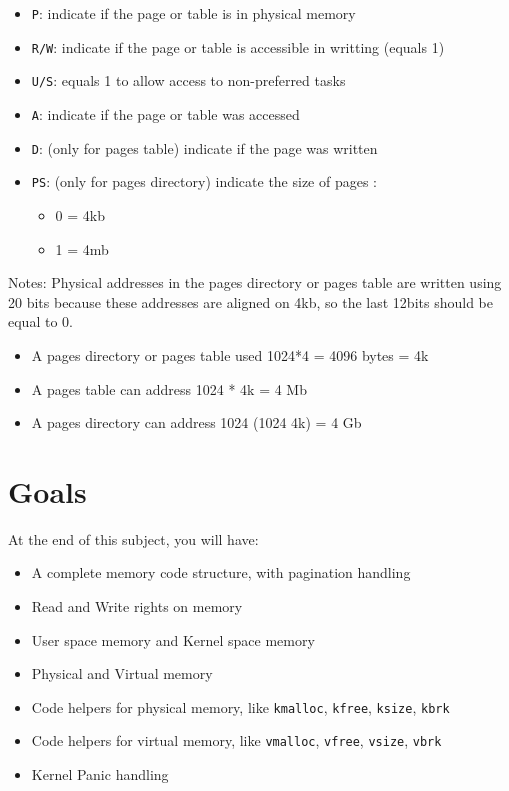 \documentclass{42-en}
\begin{document}
	\begin{itemize}\itemsep1pt
		\item \texttt{P}: indicate if the page or table is in physical memory
		\item \texttt{R/W}: indicate if the page or table is accessible in
		writting (equals 1)
		\item \texttt{U/S}: equals 1 to allow access to non-preferred tasks
		\item \texttt{A}: indicate if the page or table was accessed
		\item \texttt{D}: (only for pages table) indicate if the page was written
		\item \texttt{PS}: (only for pages directory) indicate the size of pages :
		\begin{itemize}\itemsep1pt
			\item 0 = 4kb
			\item 1 = 4mb
		\end{itemize}
	\end{itemize}

	Notes: Physical addresses in the pages directory or pages table are written
	using 20 bits because these addresses are aligned on 4kb, so the last 12bits
	should be equal to 0.

	\begin{itemize}\itemsep1pt
		\item A pages directory or pages table used 1024*4 = 4096 bytes = 4k
		\item A pages table can address 1024 * 4k = 4 Mb
		\item A pages directory can address 1024 (1024 4k) = 4 Gb
	\end{itemize}


\newpage
\chapter{Goals}

	At the end of this subject, you will have:
	\begin{itemize}\itemsep1pt
		\item A complete memory code structure, with pagination handling
		\item Read and Write rights on memory
		\item User space memory and Kernel space memory
		\item Physical and Virtual memory
		\item Code helpers for physical memory, like \texttt{kmalloc},
		\texttt{kfree}, \texttt{ksize}, \texttt{kbrk}
		\item Code helpers for virtual memory, like \texttt{vmalloc},
		\texttt{vfree}, \texttt{vsize}, \texttt{vbrk}
		\item Kernel Panic handling
	\end{itemize}
	
\end{document}
